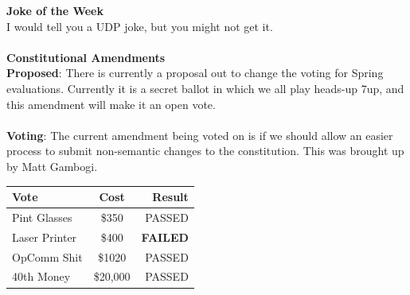 \documentclass[9pt]{extarticle} %
\begin{document}
\begin{minipage}[t]{.44\linewidth}
\begin{mdframed}[style=sidebar,frametitle={}]
\textbf{Joke of the Week} \\
I would tell you a UDP joke, but you might not get it.
\\
\\
\textbf{Constitutional Amendments} \\ 
\textbf{Proposed}: There is currently a proposal out to change the voting for Spring evaluations. Currently it is a secret ballot in which we all play heads-up 7up, and this amendment will make it an open vote. \\
\\
\textbf{Voting}: The current amendment being voted on is if we should allow an easier process to submit non-semantic changes to the constitution. This was brought up by Matt Gambogi.



\begin{tabular}{lcr}

Vote & Cost & Result \\
\midrule
Pint Glasses & \$350 & PASSED \\
Laser Printer & \$400 & \textbf{FAILED} \\
OpComm Shit & \$1020 & PASSED \\
40th Money & \$20,000 & PASSED \\
\bottomrule
\end{tabular}


\end{mdframed}
\end{minipage}\hfill %
%
%
\end{document}
